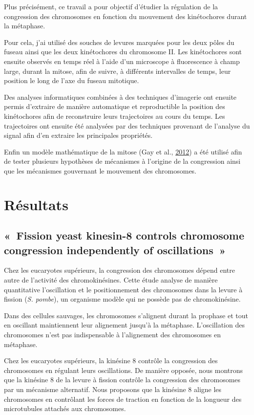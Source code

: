\documentclass[12pt,a4paper,twoside,openright]{book}
\begin{document}
Plus précisément, ce travail a pour objectif d'étudier la régulation de
la congression des chromosomes en fonction du mouvement des kinétochores
durant la métaphase.

Pour cela, j'ai utilisé des souches de levures marquées pour les deux
pôles du fuseau ainsi que les deux kinétochores du chromosome II. Les
kinétochores sont ensuite observés en temps réel à l'aide d'un
microscope à fluorescence à champ large, durant la mitose, afin de
suivre, à différents intervalles de temps, leur position le long de
l'axe du fuseau mitotique.

Des analyses informatiques combinées à des techniques d'imagerie ont
ensuite permis d'extraire de manière automatique et reproductible la
position des kinétochores afin de reconstruire leurs trajectoires au
cours du temps. Les trajectoires ont ensuite été analysées par des
techniques provenant de l'analyse du signal afin d'en extraire les
principales propriétés.

Enfin un modèle mathématique de la mitose (Gay et al.,
\protect\hyperlink{ref-Gay2012a}{2012}) a été utilisé afin de tester
plusieurs hypothèses de mécanismes à l'origine de la congression ainsi
que les mécanismes gouvernant le mouvement des chromosomes.

\clearpage\null

\chapter{Résultats}\label{ruxe9sultats}

\section{«~Fission yeast kinesin-8 controls chromosome congression
independently of oscillations~»}\label{sec:article}

Chez les eucaryotes supérieurs, la congression des chromosomes dépend
entre autre de l'activité des chromokinésines. Cette étude analyse de
manière quantitative l'oscillation et le positionnement des chromosomes
dans la levure à fission (\emph{S. pombe}), un organisme modèle qui ne
possède pas de chromokinésine.

Dans des cellules sauvages, les chromosomes s'alignent durant la
prophase et tout en oscillant maintiennent leur alignement jusqu'à la
métaphase. L'oscillation des chromosomes n'est pas indispensable à
l'alignement des chromosomes en métaphase.

Chez les eucaryotes supérieurs, la kinésine 8 contrôle la congression
des chromosomes en régulant leurs oscillations. De manière opposée, nous
montrons que la kinésine 8 de la levure à fission contrôle la
congression des chromosomes par un mécanisme alternatif. Nous proposons
que la kinésine 8 aligne les chromosomes en contrôlant les forces de
traction en fonction de la longueur des microtubules attachés aux
chromosomes.
\end{document}
